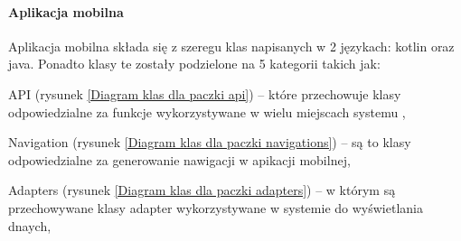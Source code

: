 		\paragraph*{Aplikacja mobilna}
		Aplikacja mobilna składa się z szeregu klas napisanych w 2 językach: kotlin oraz java. Ponadto klasy te 
		zostały podzielone na 5 kategorii takich jak:
		\begin{itemize*}
			\item API 
			(rysunek \ref{Diagram klas dla paczki api}) 
			--  które przechowuje klasy odpowiedzialne za funkcje wykorzystywane w wielu miejscach systemu ,
			\item Navigation 
			(rysunek \ref{Diagram klas dla paczki navigations}) 
			-- są to klasy odpowiedzialne za generowanie nawigacji w apikacji mobilnej,
			\item Adapters
			(rysunek \ref{Diagram klas dla paczki adapters}) 
			 -- w którym są przechowywane klasy adapter wykorzystywane w systemie do wyświetlania dnaych,
		\end{itemize*}
	
